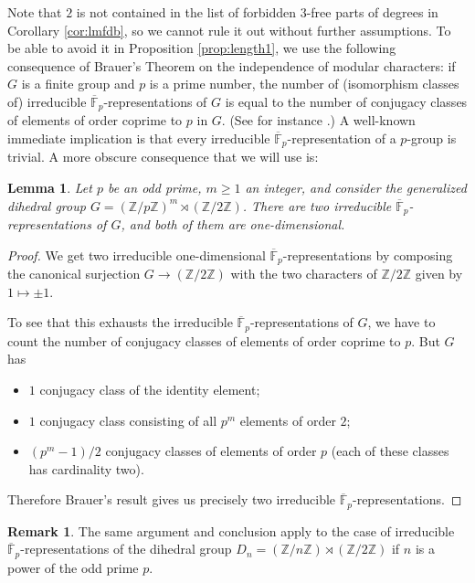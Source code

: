 \documentclass{amsart}
\newtheorem{lemma}[theorem]{Lemma}
\theoremstyle{definition}
\newtheorem{remark}[theorem]{Remark}
\newcommand{\Z}{\mathbb{Z}}
\newcommand{\F}{\mathbb{F}}
\newcommand{\bF}{\overline{\F}}
\renewcommand{\geq}{\geqslant}
\begin{document}
Note that $2$ is not contained in the list of forbidden $3$-free parts of degrees in Corollary \ref{cor:lmfdb}, so we cannot rule it out without further assumptions.
To be able to avoid it in Proposition \ref{prop:length1}, we use the following consequence of Brauer's Theorem on the independence of modular characters: if $G$ is a finite group and $p$ is a prime number, the number of (isomorphism classes of) irreducible $\bF_p$-representations of $G$ is equal to the number of conjugacy classes of elements of order coprime to $p$ in $G$.
(See for instance \cite[Corollary 3 to Theorem 42, Section 18.2]{Se2}.)
A well-known immediate implication is that every irreducible $\bF_p$-representation of a $p$-group is trivial.
A more obscure consequence that we will use is:
\begin{lemma}\label{lem:gen_dihedral}
  Let $p$ be an odd prime, $m\geq 1$ an integer, and consider the generalized dihedral group $G=(\Z/p\Z)^m \rtimes (\Z/2\Z)$.
  There are two irreducible $\bF_p$-representations of $G$, and both of them are one-dimensional.
\end{lemma}
\begin{proof}
  We get two irreducible one-dimensional $\bF_p$-representations by composing the canonical surjection $G\to (\Z/2\Z)$ with the two characters of $\Z/2\Z$ given by $1\mapsto \pm 1$.

  To see that this exhausts the irreducible $\bF_p$-representations of $G$, we have to count the number of conjugacy classes of elements of order coprime to $p$.
  But $G$ has
  \begin{itemize}
    \item $1$ conjugacy class of the identity element;
    \item $1$ conjugacy class consisting of all $p^m$ elements of order $2$;
    \item $(p^m-1)/2$ conjugacy classes of elements of order $p$ (each of these classes has cardinality two).
  \end{itemize}
  Therefore Brauer's result gives us precisely two irreducible $\bF_p$-representations.
\end{proof}
\begin{remark}\label{rem:dihedral}
  The same argument and conclusion apply to the case of irreducible $\bF_p$-representations of the dihedral group $D_n=(\Z/n\Z)\rtimes (\Z/2\Z)$ if $n$ is a power of the odd prime $p$.
\end{remark}
\end{document}

